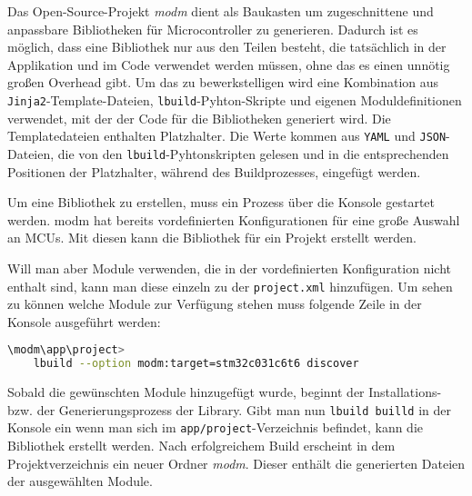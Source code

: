 Das Open-Source-Projekt \emph{modm} \cite{github_modm}\cite{modm_io}   dient als Baukasten um zugeschnittene und anpassbare Bibliotheken für Microcontroller zu generieren.
Dadurch ist es möglich, dass eine Bibliothek nur aus den Teilen besteht, die tatsächlich in der Applikation und im Code verwendet werden müssen, ohne das es einen unnötig großen Overhead gibt.
Um das zu bewerkstelligen wird eine Kombination aus \texttt{Jinja2}-Template-Dateien, \texttt{lbuild}-Pyhton-Skripte und eigenen Moduldefinitionen verwendet, mit der der Code für die Bibliotheken generiert wird.
Die Templatedateien enthalten Platzhalter.
Die Werte kommen aus \texttt{YAML} und \texttt{JSON}-Dateien, die von den \texttt{lbuild}-Pyhtonskripten gelesen und in die entsprechenden Positionen der Platzhalter, während des Buildprozesses, eingefügt werden.
 
Um eine Bibliothek zu erstellen, muss ein Prozess über die Konsole gestartet werden.
modm hat bereits vordefinierten Konfigurationen für eine große Auswahl an MCUs.
Mit diesen kann die Bibliothek für ein Projekt erstellt werden.

Will man aber Module verwenden, die in der vordefinierten Konfiguration nicht enthalt sind, kann man diese einzeln zu der \texttt{project.xml} hinzufügen.
Um sehen zu können welche Module zur Verfügung stehen muss folgende Zeile in der Konsole ausgeführt werden:

\vspace{3mm}
\begin{lstlisting}[language=bash, caption={Konsolenbefehl um verf\"ugbare Module aufgelistet zu bekommen; hier f\"ur den STM32C031C6T6 Microcontroller.}, label={lst:modm_lbild_discover}]
\modm\app\project>
	lbuild --option modm:target=stm32c031c6t6 discover
\end{lstlisting}

Sobald die gewünschten Module hinzugefügt wurde, beginnt der Installations- bzw. der Generierungsprozess der Library. 
Gibt man nun \texttt{lbuild builld} in der Konsole ein wenn man sich im \texttt{app/project}-Verzeichnis befindet, kann die Bibliothek erstellt werden.
Nach erfolgreichem Build erscheint in dem Projektverzeichnis ein neuer Ordner \emph{modm}.
Dieser enthält die generierten Dateien der ausgewählten Module.

%

